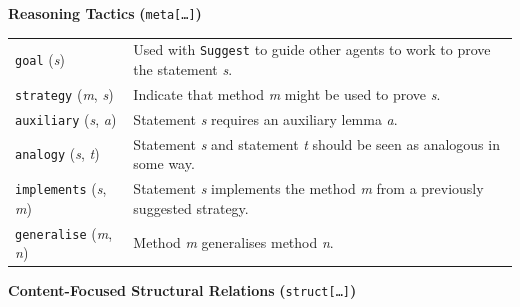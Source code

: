 \documentclass[smallextended,oneside]{svjour3}       %
\begin{document}
\begin{table}[ht]
\begin{mdframed}
\medskip

{\centering
\textbf{Reasoning Tactics} \textbf{(}\texttt{meta[\ldots]}\textbf{)}

\par}

\smallskip

\noindent
\begin{tabular}{@{\hspace{-.25ex}}p{}p{}}
\texttt{goal} (\emph{s}) & Used with \texttt{Suggest} to guide other agents to work to prove the statement \emph{s}.\\
\texttt{strategy} (\emph{m}, \emph{s}) & Indicate that method \emph{m} might be used to prove \emph{s}.\\
\texttt{auxiliary} (\emph{s}, \emph{a}) & Statement \emph{s} requires an auxiliary lemma \emph{a}.\\
\texttt{analogy} (\emph{s}, \emph{t}) & Statement \emph{s} and statement \emph{t} should be seen as analogous in some way.\\
\texttt{implements} (\emph{s}, \emph{m}) & Statement \emph{s} implements the method \emph{m} from a previously suggested strategy.\\
\texttt{generalise} (\emph{m}, \emph{n}) & Method \emph{m} generalises method \emph{n}.  \\
\end{tabular}

\medskip

{\centering
\textbf{Content-Focused Structural Relations} \textbf{(}\texttt{struct[\ldots]}\textbf{)}

\par}

\smallskip


\end{mdframed}
\end{table}
\end{document}
